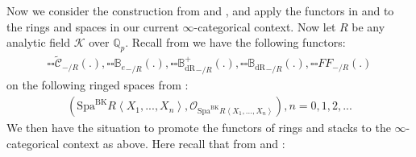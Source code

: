 \documentclass[12pt]{book}
\begin{document}
Now we consider the construction from \cite[Definition 9.3.3, Definition 9.3.5, Definition 9.3.11, Definition 9.3.9]{KL1} and \cite{KL2}, and apply the functors in \cite[Definition 9.3.3, Definition 9.3.5, Definition 9.3.11, Definition 9.3.9]{KL1} and \cite{KL2} to the rings and spaces in our current $\infty$-categorical context. Now let $R$ be any analytic field $\mathcal{K}$ over $\mathbb{Q}_p$. Recall from \cite[Definition 9.3.3, Definition 9.3.5, Definition 9.3.11, Definition 9.3.9]{KL1} we have the following functors:
\begin{align}
{\square\square}\widetilde{\mathcal{C}}_{-/R}(.),{\square\square}{\mathbb{B}_e}_{-/R}(.),{\square\square}{\mathbb{B}_\mathrm{dR}^+}_{-/R}(.),{\square\square}{\mathbb{B}_\mathrm{dR}}_{-/R}(.),{\square\square}{FF}_{-/R}(.)	
\end{align}
on the following ringed spaces from \cite{BK}:
\begin{align}
(\mathrm{Spa}^\mathrm{BK}R\left<X_1,...,X_n\right>,\mathcal{O}_{\mathrm{Spa}^\mathrm{BK}R\left<X_1,...,X_n\right>}),n=0,1,2,...	
\end{align}
We then have the situation to promote the functors of rings and stacks to the $\infty$-categorical context as above. Here recall that from \cite[Definition 9.3.3, Definition 9.3.5, Definition 9.3.11, Definition 9.3.9]{KL1} and \cite{KL2}:
\end{document}
